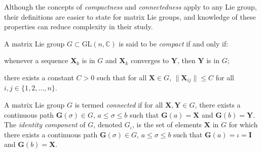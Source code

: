 Although the concepts of \emph{compactness} and \emph{connectedness} apply to any Lie group, their definitions are easier to state for matrix Lie groups, and knowledge of these properties can reduce complexity in their study.
\begin{definition}
    A matrix Lie group $G\subset\text{GL}(n,\mathbb{C})$ is said to be \emph{compact} if and only if:
    \begin{property}
        \item whenever a sequence $\mathbf{X}_k$ is in $G$ and $\mathbf{X}_k$ converges to $\mathbf{Y}$, then $\mathbf{Y}$ is in $G$;
        \item there exists a constant $C>0$ such that for all $\mathbf{X}\in G$, $\|\mathbf{X}_{ij}\|\leq C$ for all $i,j\in\{1,2,\dots,n\}$.
    \end{property}
\end{definition}
\begin{definition}
    A matrix Lie group $G$ is termed \emph{connected} if for all $\mathbf{X},\mathbf{Y}\in G$, there exists a continuous path $\mathbf{G}(\sigma)\in G$, $a\le\sigma\le b$ such that $\mathbf{G}(a) = \mathbf{X}$ and $\mathbf{G}(b) = \mathbf{Y}$. The \emph{identity component} of $G$, denoted $G_\iota$, is the set of elements $\mathbf{X}$ in  $G$ for which there exists a continuous path $\mathbf{G}(\sigma)\in G$, $a\le\sigma\le b$ such that $\mathbf{G}(a) = \iota=\mathbf{I}$ and $\mathbf{G}(b) = \mathbf{X}$.
\end{definition}

